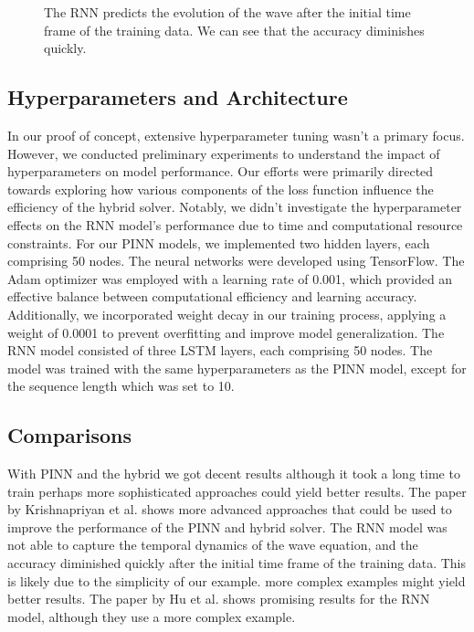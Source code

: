 \documentclass[twoside,11pt]{report}
\begin{document}
\begin{figure}[!ht]
\begin{minipage}[t]{0.5\textwidth - 1mm}
\begin{center}
            \end{center}
            \caption
            {
                The RNN predicts the evolution of the wave after the initial time frame of the training data.
                We can see that the accuracy diminishes quickly.
            }\label{fig:wave_tf_dnn}
        \end{minipage}
    \end{figure}





\subsection{Hyperparameters and Architecture}
\label{sec:hyperparameters}

    In our proof of concept, extensive hyperparameter tuning wasn't a primary focus. 
    However, we conducted preliminary experiments to understand the impact of hyperparameters 
    on model performance. Our efforts were primarily directed towards exploring how various 
    components of the loss function influence the efficiency of the hybrid solver. Notably, 
    we didn't investigate the hyperparameter effects on the RNN model's performance due to time 
    and computational resource constraints.
    For our PINN models, we implemented two hidden layers, each comprising 50 nodes. The neural 
    networks were developed using TensorFlow\cite{tensorflow2015-whitepaper}. The Adam optimizer was 
    employed with a learning 
    rate of 0.001, which provided an effective balance between computational efficiency and learning accuracy. 
    Additionally, we incorporated weight decay in our training process, applying a weight of 0.0001 to prevent 
    overfitting and improve model generalization.
    The RNN model consisted of three LSTM layers, each comprising 50 nodes. The model was trained
    with the same hyperparameters as the PINN model, except for the sequence length which was set to 10.


\subsection{Comparisons}
\label{sec:comparisons}

    With PINN and the hybrid we got decent results although it took a long time to train
    perhaps more sophisticated approaches could yield better results. The paper by 
    Krishnapriyan et al. \cite{krishnapriyan2021characterizing} shows more advanced approaches
    that could be used to improve the performance of the PINN and hybrid solver.
    The RNN model was not able to capture the temporal dynamics of the wave equation, and the accuracy diminished
    quickly after the initial time frame of the training data. This is likely due to the simplicity of our example.
    more complex examples might yield better results. The paper by Hu et al. \cite{hu2022neuralpde} shows promising
    results for the RNN model, although they use a more complex example.
\end{document}

